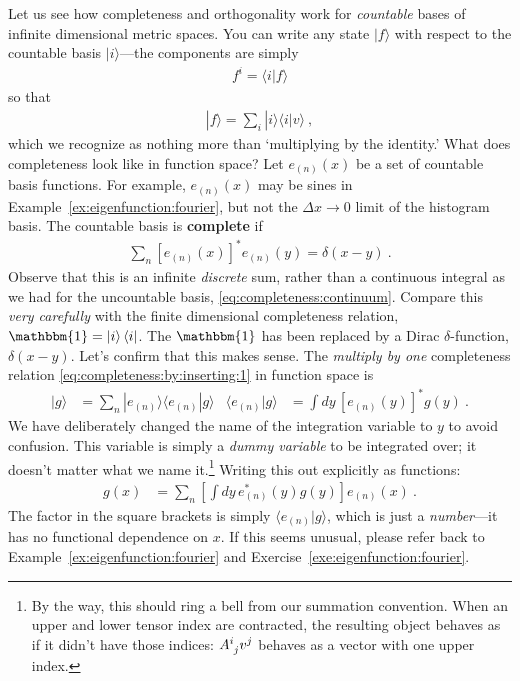 Let us see how completeness and orthogonality work for \emph{countable} bases of infinite dimensional metric spaces.  You can write any state $|f\rangle$ with respect to the countable basis $|i\rangle$---the components are simply
\begin{align}
  f^i = \langle i | f \rangle
\end{align}
so that 
\begin{align}
  |f\rangle = \sum_i |i\rangle \langle i | v \rangle \ ,
  \label{eq:completeness:by:inserting:1}
\end{align}
which we recognize as nothing more than `multiplying by the identity.' 
%
What does completeness look like in function space?
Let $e_{(n)}(x)$ be a set of countable basis functions. For example, $e_{(n)}(x)$ may be sines in Example~\ref{ex:eigenfunction:fourier}, but not the $\Delta x\to 0$ limit of the histogram basis.  The countable basis is \textbf{complete} if
\begin{align}
  \sum_n \left[e_{(n)}(x)\right]^* e_{(n)}(y) = \delta(x-y) \ .
  \label{eq:function:space:completeness}
\end{align}
Observe that this is an infinite \emph{discrete} sum, rather than a continuous integral as we had for the uncountable basis, \eqref{eq:completeness:continuum}.
Compare this \emph{very carefully} with the finite dimensional completeness relation, $\mathbbm{1} = \ket{i}\bra{i}$. The $\mathbbm{1}$ has been replaced by a Dirac $\delta$-function, $\delta(x-y)$. Let's confirm that this makes sense. The \emph{multiply by one} completeness relation \eqref{eq:completeness:by:inserting:1} in function space is
\begin{align}
  |g\rangle 
  &= 
  \sum_n |e_{(n)}\rangle\langle e_{(n)}| g\rangle
  &
  \langle e_{(n)}| g\rangle &=
  \int dy \, [e_{(n)}(y)]^* g(y) \ .
\end{align}
We have deliberately changed the name of the integration variable to $y$ to avoid confusion. This variable is simply a \emph{dummy variable} to be integrated over;  it doesn't matter what we name it.\footnote{By the way, this should ring a bell from our summation convention. When an upper and lower tensor index are contracted, the resulting object behaves as if it didn't have those indices: $\mat{A}{i}{j}v^j$ behaves as a vector with one upper index.} Writing this out explicitly as functions:
\begin{align}
  g(x) &= \sum_n\left[\int dy\, e_{(n)}^*(y)g(y)\right] e_{(n)}(x) \ .
  \label{eq:complenesss:function:space:in:action }
\end{align}
The factor in the square brackets is simply $\langle e_{(n)}| g\rangle$, which is just a \emph{number}---it has no functional dependence on $x$.
If this seems unusual, please refer back to Example~\ref{ex:eigenfunction:fourier} and Exercise~\ref{exe:eigenfunction:fourier}. 

